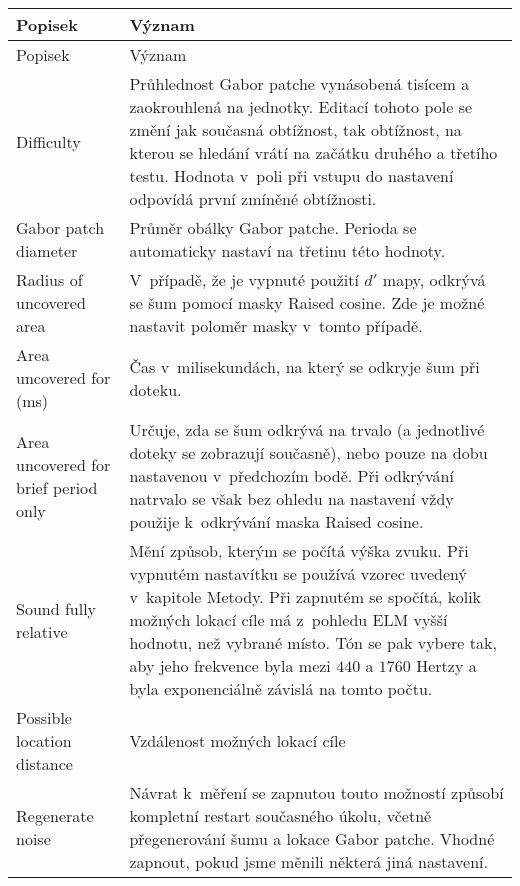 {
\renewcommand{\arraystretch}{2}
\begin{longtable}{p{}p{}}
\hline
\hline
\rowcolor{white}
Popisek & Význam \\
\hline
\endfirsthead
\hline
\hline
\rowcolor{white}
Popisek & Význam \\
\hline
\endhead
\hline
\endfoot
\hline
\hline
\endlastfoot

Difficulty & Průhlednost Gabor patche vynásobená tisícem a zaokrouhlená na
jednotky. Editací tohoto pole se změní jak současná obtížnost, tak obtížnost,
na kterou se hledání vrátí na začátku druhého a třetího testu. Hodnota v~poli
při vstupu do nastavení odpovídá první zmíněné obtížnosti.\\

Gabor patch diameter & Průměr obálky Gabor patche. Perioda se automaticky
nastaví na třetinu této hodnoty. \index{Gabor patch}\\

Radius of uncovered area & V~případě, že je vypnuté použití $d'$ mapy\index{d'
mapa@$d'$ mapa}, odkrývá se šum pomocí masky Raised cosine. Zde je možné
nastavit poloměr masky v~tomto případě.\\ 

Area uncovered for (ms) & Čas v~milisekundách, na který se odkryje šum při
doteku.\\

Area uncovered for brief period only & Určuje, zda se šum odkrývá na trvalo (a
jednotlivé doteky se zobrazují současně), nebo pouze na dobu nastavenou
v~předchozím bodě. Při odkrývání natrvalo se však bez ohledu na nastavení vždy
použije k~odkrývání maska Raised cosine.\\

Sound fully relative & Mění způsob, kterým se počítá výška zvuku. Při vypnutém
nastavítku se používá vzorec uvedený v~kapitole Metody. Při zapnutém se
spočítá, kolik možných lokací cíle má z~pohledu ELM vyšší hodnotu, než vybrané
místo. Tón se pak vybere tak, aby jeho frekvence byla mezi $440$ a $1760$
Hertzy a byla exponenciálně závislá na tomto počtu. \\

Possible location distance & Vzdálenost možných lokací cíle \\

Regenerate noise & Návrat k~měření se zapnutou touto možností způsobí kompletní
restart současného úkolu, včetně přegenerování šumu a lokace Gabor patche.
Vhodné zapnout, pokud jsme měnili některá jiná nastavení. \\


\end{longtable}}
